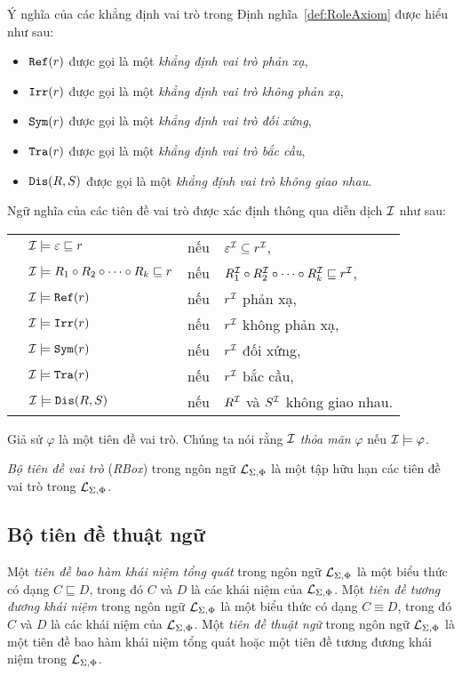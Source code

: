 Ý nghĩa của các khẳng định vai trò trong Định nghĩa~\ref{def:RoleAxiom} được hiểu như sau:
\begin{itemize}
	\item $\mathtt{Ref}(r)$ được gọi là một {\em khẳng định vai trò phản xạ},
	\item $\mathtt{Irr}(r)$ được gọi là một {\em khẳng định vai trò không phản xạ},
	\item $\mathtt{Sym}(r)$ được gọi là một {\em khẳng định vai trò đối xứng},
	\item $\mathtt{Tra}(r)$ được gọi là một {\em khẳng định vai trò bắc cầu},
	\item $\mathtt{Dis}(R,S)$ được gọi là một {\em khẳng định vai trò không giao nhau}.        
\end{itemize}

Ngữ nghĩa của các tiên đề vai trò được xác định thông qua diễn dịch $\mathcal{I}$ như sau:\\[1.0ex]
\begin{tabular}{c l c l}
	& $\mathcal{I} \models \varepsilon \sqsubseteq r$ & nếu & $\varepsilon^{\mathcal{I}} \subseteq r^{\mathcal{I}}$,\\[0.5ex]
	& $\mathcal{I} \models R_1 \circ R_2 \circ \cdots \circ R_k \sqsubseteq r$ & nếu & $R_1^{\mathcal{I}} \circ R_2^{\mathcal{I}} \circ \cdots \circ R_k^{\mathcal{I}} \sqsubseteq r^{\mathcal{I}}$,\\[0.5ex]
	& $\mathcal{I} \models \mathtt{Ref}(r)$ & nếu & $r^{\mathcal{I}}$ phản xạ,\\[0.5ex]
	& $\mathcal{I} \models \mathtt{Irr}(r)$ & nếu & $r^{\mathcal{I}}$ không phản xạ,\\[0.5ex]
	& $\mathcal{I} \models \mathtt{Sym}(r)$ & nếu & $r^{\mathcal{I}}$ đối xứng,\\[0.5ex]
	& $\mathcal{I} \models \mathtt{Tra}(r)$ & nếu & $r^{\mathcal{I}}$ bắc cầu,\\[0.5ex]
	& $\mathcal{I} \models \mathtt{Dis}(R,S)$ & nếu & $R^{\mathcal{I}}$ và $S^{\mathcal{I}}$ không giao nhau.
\end{tabular}

Giả sử $\varphi$ là một tiên đề vai trò. Chúng ta nói rằng $\mathcal{I}$ {\em thỏa mãn} $\varphi$ nếu $\mathcal{I} \models \varphi$.

\begin{Definition}
\label{def:RBox}
	{\em Bộ tiên đề vai trò} ({\em RBox}) trong ngôn ngữ $\mathcal{L}_{\Sigma,\Phi}$ là một tập hữu hạn các tiên đề vai trò trong $\mathcal{L}_{\Sigma,\Phi}$.\myend
\end{Definition}

\subsection{Bộ tiên đề thuật ngữ}
\label{sec:Chap1.TBox}
\begin{Definition}
\label{def:TerminologyAxiom}
	Một {\em tiên đề bao hàm khái niệm tổng quát} trong ngôn ngữ $\mathcal{L}_{\Sigma,\Phi}$ là một biểu thức có dạng $C \sqsubseteq D$, trong đó $C$ và $D$ là các khái niệm của $\mathcal{L}_{\Sigma,\Phi}$. 
%
	Một {\em tiên đề tương đương khái niệm} trong ngôn ngữ $\mathcal{L}_{\Sigma,\Phi}$ là một biểu thức có dạng $C \equiv D$, trong đó $C$ và $D$ là các khái niệm của $\mathcal{L}_{\Sigma,\Phi}$. 
%
	Một {\em tiên đề thuật ngữ} trong ngôn ngữ $\mathcal{L}_{\Sigma,\Phi}$ là một tiên đề bao hàm khái niệm tổng quát hoặc một tiên đề tương đương khái niệm trong $\mathcal{L}_{\Sigma,\Phi}$.\myend
\end{Definition}

